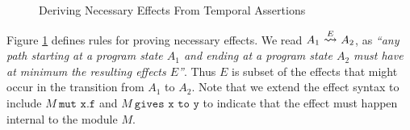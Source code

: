 \documentclass[12pt]{article}
\newcommand\trans[1]{\overset{#1}{\mathlarger{\mathlarger \leadsto}}}
\begin{document}
\begin{figure}[t]
\small
{} 
\caption{Deriving Necessary Effects From Temporal Assertions}
\label{f:effectInference}
\end{figure}

Figure \ref{f:effectInference} defines rules for proving necessary effects. We read $A_1\ \trans{E}\ A_2$,
as \emph{``any path starting at a program state $A_1$ and ending at a program state $A_2$ must have at minimum the
resulting effects $E$''}. Thus $E$ is subset of the effects that might occur in the transition from $A_1$ to $A_2$. 
Note that we extend the effect syntax to include $M\ \texttt{mut x.f}$ and $M\ \texttt{gives x to y}$ to indicate 
that the effect must happen internal to the module $M$.
\end{document}
